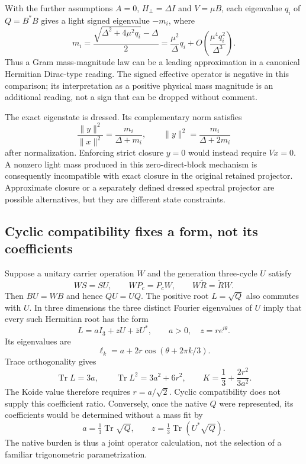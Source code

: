 With the further assumptions $A=0$, $H_\perp=\Delta I$ and
$V=\mu B$, each eigenvalue $q_i$ of $Q=B^*B$ gives a light
signed eigenvalue $-m_i$, where
\begin{equation}
 m_i=\frac{\sqrt{\Delta^2+4\mu^2q_i}-\Delta}{2}
 =\frac{\mu^2}{\Delta}q_i
  +O\left(\frac{\mu^4q_i^2}{\Delta^3}\right).
\end{equation}
Thus a Gram mass-magnitude law can be a leading approximation in
a canonical Hermitian Dirac-type reading. The signed effective
operator is negative in this comparison; its interpretation as a
positive physical mass magnitude is an additional reading, not
a sign that can be dropped without comment.

The exact eigenstate is dressed. Its complementary norm satisfies
\begin{equation}
 \frac{\|y\|^2}{\|x\|^2}=\frac{m_i}{\Delta+m_i},\qquad
 \|y\|^2=\frac{m_i}{\Delta+2m_i}
\end{equation}
after normalization. Enforcing strict closure $y=0$ would instead
require $Vx=0$. A nonzero light mass produced in this zero-direct-block
mechanism is consequently incompatible with exact closure in the
original retained projector. Approximate closure or a separately
defined dressed spectral projector are possible alternatives, but
they are different state constraints.

\subsection{Cyclic compatibility fixes a form, not its coefficients}
Suppose a unitary carrier operation $W$ and the generation three-cycle
$U$ satisfy
\begin{equation}
 WS=SU,\qquad WP_c=P_cW,\qquad W\widetilde R=\widetilde RW.
\end{equation}
Then $BU=WB$ and hence $QU=UQ$. The positive root $L=\sqrt Q$
also commutes with $U$. In three dimensions the three distinct Fourier
eigenvalues of $U$ imply that every such Hermitian root has the form
\begin{equation}
 L=aI_3+zU+\overline zU^*,\qquad a>0,\quad z=re^{i\theta}.
\end{equation}
Its eigenvalues are
\begin{equation}
 \ell_k=a+2r\cos(\theta+2\pi k/3).
\end{equation}
Trace orthogonality gives
\begin{equation}
 \operatorname{Tr}L=3a,\qquad
 \operatorname{Tr}L^2=3a^2+6r^2,\qquad
 K=\frac13+\frac{2r^2}{3a^2}.
\end{equation}
The Koide value therefore requires $r=a/\sqrt2$. Cyclic compatibility
does not supply this coefficient ratio. Conversely, once the native
$Q$ were represented, its coefficients would be determined without a
mass fit by
\begin{equation}
 a=\tfrac13\operatorname{Tr}\sqrt Q,\qquad
 z=\tfrac13\operatorname{Tr}(U^*\sqrt Q).
\end{equation}
The native burden is thus a joint operator calculation, not the
selection of a familiar trigonometric parametrization.

